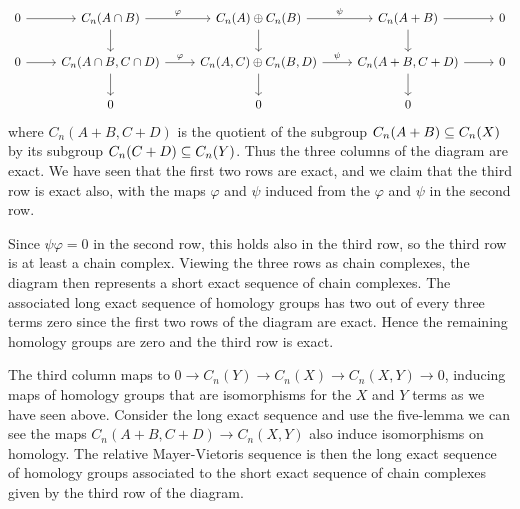 \begin{example}
\[\begin{tikzcd}
0\ar[r]&C_n(A\cap B)\ar[d]\ar[r,"\varphi"]&C_n(A)\oplus C_n(B)\ar[r,"\psi"]\ar[d]&C_n(A+B)\ar[d]\ar[r]&0\\
0\ar[r]&C_n(A\cap B,C\cap D)\ar[d]\ar[r,"\varphi"]&C_n(A,C)\oplus C_n(B,D)\ar[d]\ar[r,"\psi"]&C_n(A+B,C+D)\ar[d]\ar[r]&0\\
&0&0&0&
\end{tikzcd}\]
where $C_n(A+B,C+D)$ is the quotient of the subgroup $C_n(A+B)\subseteq C_n(X)$ by its subgroup $C_n(C+D)\subseteq C_n(Y)$. Thus the three columns of the diagram are exact. We have seen that the first two rows are exact, and we claim that the third row is exact also, with the maps $\varphi$ and $\psi$ induced from the $\varphi$ and $\psi$ in the second row.\par
Since $\psi\varphi=0$ in the second row, this holds also in the third row, so the third row is at least a chain complex. Viewing the three rows as chain complexes, the diagram then represents a short exact sequence of chain complexes. The associated long exact sequence of homology groups has two out of every three terms zero since the first two rows of the diagram are exact. Hence the remaining homology groups are zero and the third row is exact.\par
The third column maps to $0\to C_n(Y)\to C_n(X)\to C_n(X,Y)\to 0$, inducing maps of homology groups that are isomorphisms for the $X$ and $Y$ terms as we have seen above. Consider the long exact sequence and use the five-lemma we can see the maps $C_n(A+B,C+D)\to C_n(X,Y)$ also induce isomorphisms on homology. The relative Mayer-Vietoris sequence is then the long exact sequence of homology groups associated to the short exact sequence of chain complexes given by the third row of the diagram.
\end{example}
